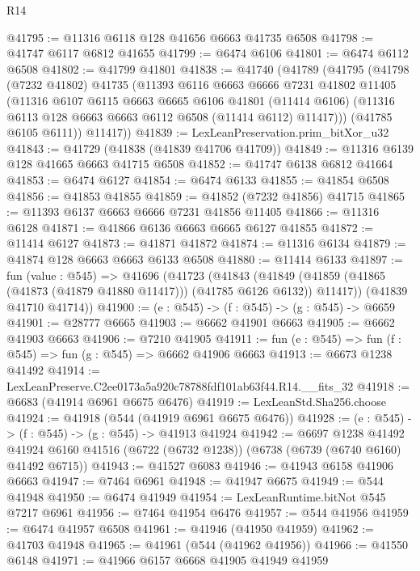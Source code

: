 \begin{lexlean}{R14}
\begin{coremodule}
@41795 := @11316 @6118 @128 @41656 @6663 @41735 @6508
@41798 := @41747 @6117 @6812 @41655
@41799 := @6474 @6106
@41801 := @6474 @6112 @6508
@41802 := @41799 @41801
@41838 := @41740
    (@41789
      (@41795
        (@41798
          (@7232 @41802)
          @41735
          (@11393
            @6116
            @6663
            @6666
            @7231
            @41802
            @11405
            (@11316
              @6107
              @6115
              @6663
              @6665
              @6106
              @41801
              (@11414 @6106)
              (@11316 @6113 @128 @6663 @6663 @6112 @6508 (@11414 @6112) @11417)))
          (@41785 @6105 @6111))
        @11417))
@41839 := LexLeanPreservation.prim_bitXor_u32
@41843 := @41729 (@41838 (@41839 @41706 @41709))
@41849 := @11316 @6139 @128 @41665 @6663 @41715 @6508
@41852 := @41747 @6138 @6812 @41664
@41853 := @6474 @6127
@41854 := @6474 @6133
@41855 := @41854 @6508
@41856 := @41853 @41855
@41859 := @41852 (@7232 @41856) @41715
@41865 := @11393 @6137 @6663 @6666 @7231 @41856 @11405
@41866 := @11316 @6128
@41871 := @41866 @6136 @6663 @6665 @6127 @41855
@41872 := @11414 @6127
@41873 := @41871 @41872
@41874 := @11316 @6134
@41879 := @41874 @128 @6663 @6663 @6133 @6508
@41880 := @11414 @6133
@41897 := fun (value : @545) =>
  @41696
    (@41723
      (@41843
        (@41849 (@41859 (@41865 (@41873 (@41879 @41880 @11417))) (@41785 @6126 @6132)) @11417))
      (@41839 @41710 @41714))
@41900 := (e : @545) -> (f : @545) -> (g : @545) -> @6659
@41901 := @28777 @6665
@41903 := @6662 @41901 @6663
@41905 := @6662 @41903 @6663
@41906 := @7210 @41905
@41911 := fun (e : @545) => fun (f : @545) => fun (g : @545) => @6662 @41906 @6663
@41913 := @6673 @1238 @41492
@41914 := LexLeanPreserve.C2ee0173a5a920c78788fdf101ab63f44.R14.__fits_32
@41918 := @6683 (@41914 @6961 @6675 @6476)
@41919 := LexLeanStd.Sha256.choose
@41924 := @41918 (@544 (@41919 @6961 @6675 @6476))
@41928 := (e : @545) -> (f : @545) -> (g : @545) -> @41913 @41924
@41942 := @6697
    @1238
    @41492
    @41924
    @6160
    @41516
    (@6722 (@6732 @1238))
    (@6738 (@6739 (@6740 @6160) @41492 @6715))
@41943 := @41527 @6083
@41946 := @41943 @6158 @41906 @6663
@41947 := @7464 @6961
@41948 := @41947 @6675
@41949 := @544 @41948
@41950 := @6474 @41949
@41954 := LexLeanRuntime.bitNot @545 @7217 @6961
@41956 := @7464 @41954 @6476
@41957 := @544 @41956
@41959 := @6474 @41957 @6508
@41961 := @41946 (@41950 @41959)
@41962 := @41703 @41948
@41965 := @41961 (@544 (@41962 @41956))
@41966 := @41550 @6148
@41971 := @41966 @6157 @6668 @41905 @41949 @41959

\end{coremodule}
\end{lexlean}
